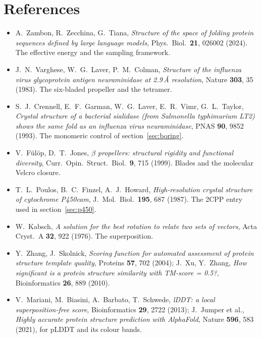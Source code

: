 \documentclass[11pt,a4paper]{article}
\begin{document}
\section{References}

\begin{itemize}
  \item A.~Zambon, R.~Zecchina, G.~Tiana, \emph{Structure of the space of folding
        protein sequences defined by large language models}, Phys.\ Biol.\
        \textbf{21}, 026002 (2024). The effective energy and the sampling
        framework.
  \item J.~N.~Varghese, W.~G.~Laver, P.~M.~Colman, \emph{Structure of the
        influenza virus glycoprotein antigen neuraminidase at 2.9\,\AA{}
        resolution}, Nature \textbf{303}, 35 (1983). The six-bladed propeller and
        the tetramer.
  \item S.~J.~Crennell, E.~F.~Garman, W.~G.~Laver, E.~R.~Vimr, G.~L.~Taylor,
        \emph{Crystal structure of a bacterial sialidase (from Salmonella
        typhimurium LT2) shows the same fold as an influenza virus
        neuraminidase}, PNAS \textbf{90}, 9852 (1993). The monomeric control of
        section~\ref{sec:boring}.
  \item V.~F\"ul\"op, D.~T.~Jones, \emph{$\beta$ propellers: structural rigidity
        and functional diversity}, Curr.\ Opin.\ Struct.\ Biol.\ \textbf{9}, 715
        (1999). Blades and the molecular Velcro closure.
  \item T.~L.~Poulos, B.~C.~Finzel, A.~J.~Howard, \emph{High-resolution crystal
        structure of cytochrome P450cam}, J.\ Mol.\ Biol.\ \textbf{195}, 687
        (1987). The 2CPP entry used in section~\ref{sec:p450}.
  \item W.~Kabsch, \emph{A solution for the best rotation to relate two sets of
        vectors}, Acta Cryst.\ A \textbf{32}, 922 (1976). The superposition.
  \item Y.~Zhang, J.~Skolnick, \emph{Scoring function for automated assessment of
        protein structure template quality}, Proteins \textbf{57}, 702 (2004);
        J.~Xu, Y.~Zhang, \emph{How significant is a protein structure similarity
        with TM-score = 0.5?}, Bioinformatics \textbf{26}, 889 (2010).
  \item V.~Mariani, M.~Biasini, A.~Barbato, T.~Schwede, \emph{lDDT: a local
        superposition-free score}, Bioinformatics \textbf{29}, 2722 (2013);
        J.~Jumper et al., \emph{Highly accurate protein structure prediction with
        AlphaFold}, Nature \textbf{596}, 583 (2021), for pLDDT and its colour
        bands.
\end{itemize}
\end{document}
